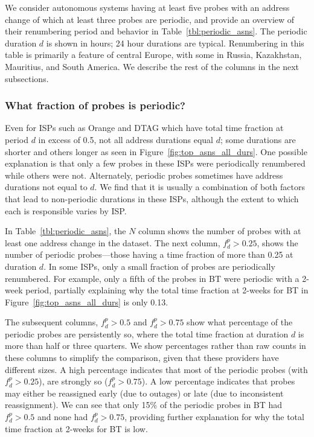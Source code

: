 We consider autonomous systems having at least five probes with an
address change of which at least three probes are
periodic, and provide an overview of their renumbering
period and behavior in Table~\ref{tbl:periodic_asns}.
The periodic duration $d$ is shown in hours; 24 hour durations are
typical.  Renumbering in this table is primarily a feature of
central Europe, with some in Russia, Kazakhstan, Mauritius, and South America.
We describe the rest of the columns in the next subsections.

\subsubsection{What fraction of probes is periodic?}

Even for ISPs such as Orange and DTAG which have total
time fraction at period $d$ in excess of 0.5, not all address durations equal
$d$; some durations are shorter and others longer as seen in Figure~\ref{fig:top_asns_all_durs}. One possible
explanation is that only a few
probes in these ISPs were periodically renumbered while others were
not. Alternately, periodic probes sometimes have address
durations not equal to $d$. We find that it is usually a combination
of both factors that lead to non-periodic durations in these
ISPs, although the extent to which each is responsible varies by ISP.

In Table~\ref{tbl:periodic_asns}, the $N$ column shows
the number of probes with at least one address change in the
dataset.  The next column, $f^p_d > 0.25$, shows the number
of periodic probes---those having a time fraction of
more than 0.25 at duration $d$. In some ISPs, only a small fraction of
probes are periodically renumbered. For example, only a fifth
of the probes in BT were periodic with a 2-week period, partially explaining why
the total time fraction at 2-weeks for BT in
Figure~\ref{fig:top_asns_all_durs} is only 0.13. 

The subsequent columns, $f^p_d > 0.5$ and $f^p_d > 0.75$
show what percentage of the periodic probes are persistently
so, where the total time fraction at duration $d$ is more
than half or three quarters.  We show percentages rather
than raw counts in these columns to simplify the comparison,
given that these providers have different sizes.  A high percentage
indicates that most of the periodic probes (with $f^p_d > 0.25$),
are strongly so ($f^p_d > 0.75$).  A low percentage indicates
that probes may either be reassigned early (due to outages) or late
(due to inconsistent reassignment). We can see that only 15\% of the
periodic probes in
BT had $f^p_d > 0.5$  and none had $f^p_d > 0.75$, providing further
explanation for why the total time fraction at 2-weeks for BT is low.


